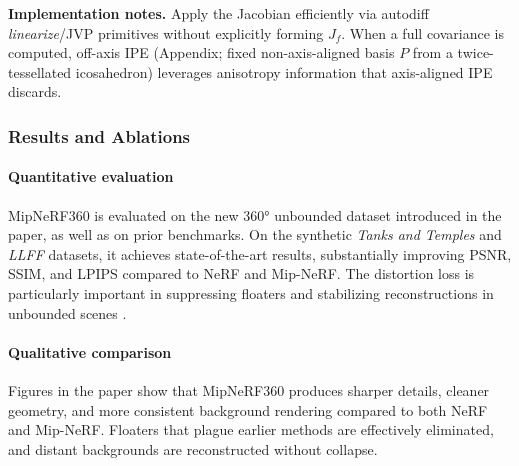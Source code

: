 \begin{enrichment}
\begin{enrichment}
        \textbf{Implementation notes.} Apply the Jacobian efficiently via autodiff \emph{linearize}/JVP primitives without explicitly forming $J_f$. When a full covariance is computed, off-axis IPE (Appendix; fixed non-axis-aligned basis $P$ from a twice-tessellated icosahedron) leverages anisotropy information that axis-aligned IPE discards.
        
        \newpage
        
        \subsubsection{Results and Ablations}
        \label{subsubsec:chapter23_mipnerf360_results}
        
        \paragraph{Quantitative evaluation}
        MipNeRF360 is evaluated on the new 360° unbounded dataset introduced in the paper, as well as on prior benchmarks. On the synthetic \emph{Tanks and Temples} and \emph{LLFF} datasets, it achieves state-of-the-art results, substantially improving PSNR, SSIM, and LPIPS compared to NeRF and Mip-NeRF. The distortion loss is particularly important in suppressing floaters and stabilizing reconstructions in unbounded scenes \cite{barron2022_mipnerf360}.
        
        \paragraph{Qualitative comparison}
        Figures in the paper show that MipNeRF360 produces sharper details, cleaner geometry, and more consistent background rendering compared to both NeRF and Mip-NeRF. Floaters that plague earlier methods are effectively eliminated, and distant backgrounds are reconstructed without collapse.
        

\end{enrichment}
\end{enrichment}

